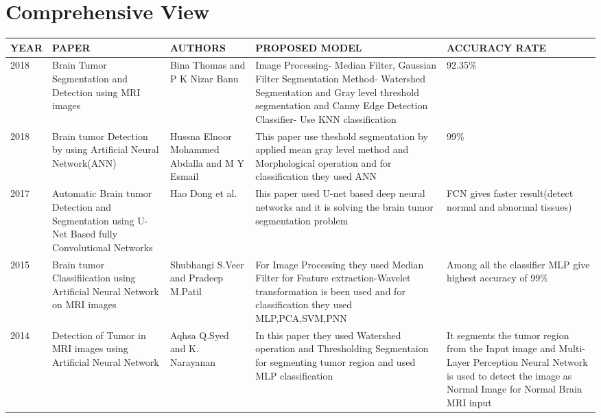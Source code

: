 \section{Comprehensive View}
\begin{table}[h!]
   \centering
    \begin{tabular}{|l|p{3cm}|p{3cm}|p{3cm}|p{3cm}|}
         \hline
        
    \textbf{YEAR} & \textbf{PAPER} &  \textbf{AUTHORS} &  \textbf{PROPOSED MODEL} & \textbf{ACCURACY RATE}\\
        
      \hline
      
     2018 & Brain Tumor Segmentation and Detection using MRI images & Bina Thomas and P K Nizar Banu  & Image Processing- Median Filter, Gaussian Filter Segmentation Method- Watershed Segmentation and Gray level threshold segmentation and Canny Edge Detection Classifier- Use KNN classification & 92.35\%  \\

    \hline
    
    2018 & Brain tumor Detection by using Artificial Neural Network(ANN) &  Hussna Elnoor Mohammed Abdalla and M Y Esmail  & This paper use theshold segmentation by applied mean gray level method and Morphological operation and for classification they used ANN  &    99\% \\

   \hline
   
   2017  & Automatic Brain tumor Detection and Segmentation using U-Net Based fully Convolutional Networks & Hao Dong et al. & Ihis paper used U-net based deep neural networks and it is solving the brain tumor segmentation problem & FCN gives faster result(detect normal and abnormal tissues)\\
   
   \hline
   
   2015  & Brain tumor Classifiication using Artificial Neural Network on MRI images & Shubhangi S.Veer and Pradeep M.Patil & For Image Processing they used  Median Filter for  Feature extraction-Wavelet transformation is been used and for  classification they used MLP,PCA,SVM,PNN & Among all the classifier MLP give highest accuracy of 99\% \\
        
  \hline
   
   2014  & Detection of Tumor in MRI images using Artificial Neural Network & Aqhsa Q.Syed and K. Narayanan & In this paper they used Watershed operation and Thresholding Segmentaion for segmenting tumor region and used MLP classification &  It segments the tumor region from the Input image and Multi-Layer Perception Neural Network is used to detect the image as Normal Image for Normal Brain MRI input \\


\end{tabular}
\end{table}
